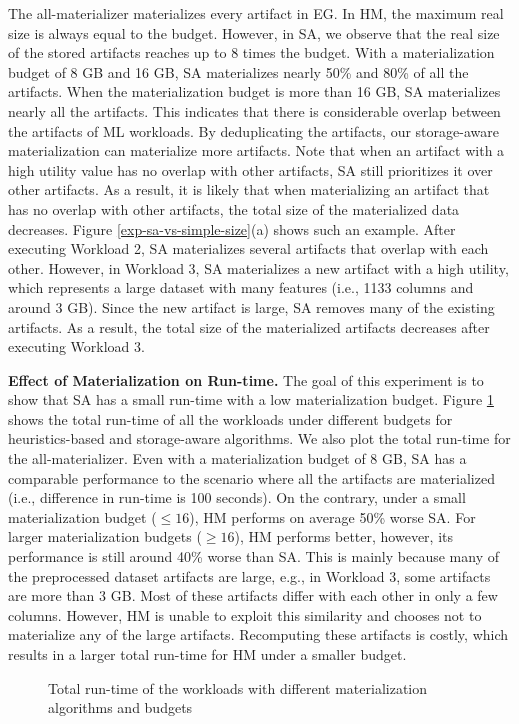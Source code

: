 The all-materializer materializes every artifact in EG.
In HM, the maximum real size is always equal to the budget.
However, in SA, we observe that the real size of the stored artifacts reaches up to 8 times the budget.
With a materialization budget of 8 GB and 16 GB, SA materializes nearly 50\% and 80\% of all the artifacts.
When the materialization budget is more than 16 GB, SA materializes nearly all the artifacts.
This indicates that there is considerable overlap between the artifacts of ML workloads.
By deduplicating the artifacts, our storage-aware materialization can materialize more artifacts.
Note that when an artifact with a high utility value has no overlap with other artifacts, SA still prioritizes it over other artifacts.
As a result, it is likely that when materializing an artifact that has no overlap with other artifacts, the total size of the materialized data decreases.
Figure \ref{exp-sa-vs-simple-size}(a) shows such an example.
After executing Workload 2, SA materializes several artifacts that overlap with each other.
However, in Workload 3, SA materializes a new artifact with a high utility, which represents a large dataset with many features (i.e., 1133 columns and around 3 GB).
Since the new artifact is large, SA removes many of the existing artifacts.
As a result, the total size of the materialized artifacts decreases after executing Workload 3.

\textbf{Effect of Materialization on Run-time.}
The goal of this experiment is to show that SA has a small run-time with a low materialization budget.
Figure \ref{run-time-vs-mat} shows the total run-time of all the workloads under different budgets for heuristics-based and storage-aware algorithms.
We also plot the total run-time for the all-materializer.
Even with a materialization budget of 8 GB, SA has a comparable performance to the scenario where all the artifacts are materialized (i.e., difference in run-time is 100 seconds).
On the contrary, under a small materialization budget ($\leq 16$), HM performs on average 50\% worse SA.
For larger materialization budgets ($\geq 16$), HM performs better, however, its performance is still around 40\% worse than SA.
This is mainly because many of the preprocessed dataset artifacts are large, e.g., in Workload 3, some artifacts are more than 3 GB.
Most of these artifacts differ with each other in only a few columns.
However, HM is unable to exploit this similarity and chooses not to materialize any of the large artifacts.
Recomputing these artifacts is costly, which results in a larger total run-time for HM under a smaller budget.
\begin{figure}[t]
\centering
 \resizebox{\columnwidth}{!}{%
%
}
\caption{Total run-time of the workloads with different materialization algorithms and budgets}
\label{run-time-vs-mat}
\end{figure}

